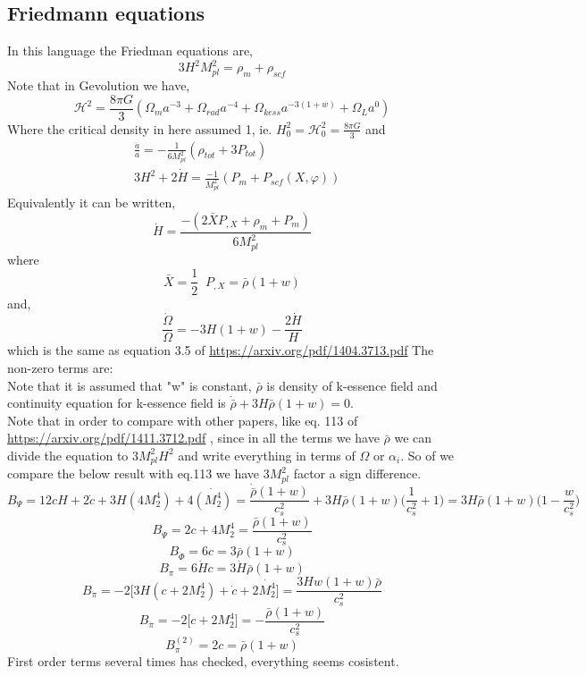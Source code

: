 \documentclass[a4paper,11pt]{article}
\def\be{\begin{equation}}
\def\ee{\end{equation}}
\begin{document}
\subsection{Friedmann equations}
In this language the Friedman equations are,
\be
3{H}^2 M_{pl}^2= \rho_m + \rho_{scf}
\ee
Note that in Gevolution we have,
\be
\mathcal{H}^2=\frac{8 \pi G}{3} (\Omega_m a^{-3} +\Omega_{rad} a^{-4} +\Omega_{kess} a^{-3(1+w)} +\Omega_L a^{0} )
\ee
Where the critical density in here assumed 1, ie. $H_0^2=\mathcal{H}_0^2=\frac{8 \pi G}{3}$
and 
\begin{align}
&\frac{\ddot{a}}{a} = - \frac{1}{6M^2_{pl}} \left (\rho_{tot} +3 P_{tot}\right ) \\ \nonumber &
3 H^2 + 2\dot{H} = \frac{-1}{M^2_{pl}} \left( P_{m} + P_{scf} (X, \varphi) \right)
\end{align}
Equivalently it can be written,
\be
\dot{H}= \frac{-(2 \bar{X} P_{,X} + \rho_m+ P_m)}{6 M^2_{pl}}
\ee
where
\be
\bar{X}=\frac{1}{2} \; \; P_{,X} = \bar{\rho} (1+w)
\ee
and,
\be
\frac{\dot{\Omega}}{\Omega}= -3 H(1+w) -\frac{2\dot{H}}{H}
\ee
which is the same as equation 3.5 of \url{https://arxiv.org/pdf/1404.3713.pdf} 
The non-zero terms are:\\
{\color{red} Note that it is assumed that "w" is constant, $\bar{\rho}$ is density of k-essence field and continuity equation for k-essence field is $\dot{\bar{\rho}} +3 H \bar{\rho} (1+w)=0 $}.
\\Note that in order to compare with other papers, like eq. 113 of \url{https://arxiv.org/pdf/1411.3712.pdf} , since in all the terms we have $\bar{\rho}$ we can divide the equation to $3 M_{pl}^2 H^2$ and write everything in terms of $\Omega$ or $\alpha_i$. So of we compare the below result with eq.113 we have 3$M_{pl}^2$ factor a sign difference.
\be
B_{\Psi}=12 c H+2 \dot{c}  + 3H ( 4M_2^4)+4 \dot{(M_2^4)} =  \frac{\dot{\bar{\rho}} (1+w)}{c_s^2} + 3 {H} \bar{\rho} (1+w) \Big( \frac{1}{c_s^2}+1 \Big)=3 {H} \bar{\rho} (1+w) \Big( 1- \frac{w}{c_s^2} \Big )
\ee
\be
B_{\dot{\Psi}}=2c + 4 M_2^4 =  \frac{\bar{\rho} (1+w)}{c_s^2}
\ee
\be
B_{\dot{\Phi}}=6 c = 3 \bar{\rho} (1+w)
\ee
\be
B_{{\pi}}= 6 \dot{H} c= 3 \dot{H} \bar{\rho} (1+w)
\ee
\be
B_{\dot{\pi}}=- 2\Big[ 3 H (c+ 2 M_2^4) +\dot{c} + 2\dot{M_2^4} \Big] = \frac{3 H w (1+w) \bar{\rho} }{c_s^2}
\ee
\be
B_{\ddot{\pi}}=- 2\Big[  c+ 2 M_2^4 \Big]=- \frac{  \bar{\rho}(1+w) }{c_s^2}
\ee
\be
B^{(2)}_{{\pi}}=
2c  =\bar{\rho}(1+w) 
\ee
First order terms several times has checked, everything seems cosistent.
\end{document}
